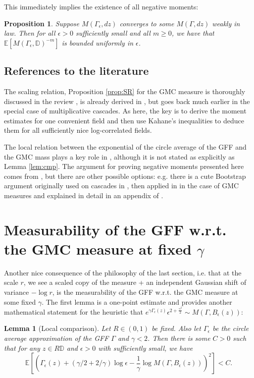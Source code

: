 \documentclass[11pt]{amsart}
\newtheorem{lemma}[thm]{Lemma}
\newtheorem{prop}[thm]{Proposition}
\newcommand{\D}{\mathbb D}
\newcommand{\E}{\mathbb E}
\renewcommand{\1}{\mathbf 1}
\newcommand{\eps}{\epsilon}
\begin{document}
This immediately implies the existence of all negative moments:

\begin{prop}\label{prop:nm}
Suppose $M(\Gamma_\eps, dz)$ converges to some $M(\Gamma, dz)$ weakly in law. Then for all $\eps >0$ sufficiently small and all $m \geq 0$, we have that $\E \left[M(\Gamma_\eps, \D)^{-m}\right]$ is bounded uniformly in $\eps$.
\end{prop}

\subsection*{References to the literature}

The scaling relation, Proposition \ref{prop:SR} for the GMC measure is thoroughly discussed in the review \cite{RVrev}, is already derived in \cite{RV}, but goes back much earlier in the special case of multiplicative cascades. As here, the key is to derive the moment estimates for one convenient field and then use Kahane's inequalities to deduce them for all sufficiently nice log-correlated fields. 

The local relation between the exponential of the circle average of the GFF and the GMC mass plays a key role in \cite{DS}, although it is not stated as explicitly as Lemma \ref{lem:cmp}. The argument for proving negative moments presented here comes from \cite{DS}, but there are other possible options: e.g. there is a cute Bootstrap argument originally used on cascades in \cite{Molchan}, then applied in \cite{RV} in the case of GMC measures and explained in detail in an appendix of \cite{RCW}.

\section{Measurability of the GFF w.r.t. the GMC measure at fixed $\gamma$}\label{sec:meas}

Another nice consequence of the philosophy of the last section, i.e. that at the scale $r$, we see a scaled copy of the measure + an independent Gaussian shift of variance $-\log r$, is the measurability of the GFF w.r.t. the GMC measure at some fixed $\gamma$. The first lemma is a one-point estimate and provides another mathematical statement for the heuristic that $e^{\gamma \Gamma_\eps(z)} \eps^{2+\frac{\gamma^2}{2}} \sim M(\Gamma, B_\eps(z))$:

\begin{lemma}[Local comparison]\label{lem:lcl}
Let $R \in (0,1)$ be fixed. Also let $\Gamma_\eps$ be the circle average approximation of the GFF $\Gamma$ and $\gamma < 2$. Then there is some $C > 0$ such that for any $z \in R\D$  and $\eps > 0$ with sufficiently small, we have 
$$\E\left[\left(\Gamma_\eps(z) + (\gamma/2 + 2/\gamma)\log \eps - \frac{1}{\gamma} \log M(\Gamma, B_{\eps}(z)) \right)^2\right] < C.$$
\end{lemma}
\end{document}
